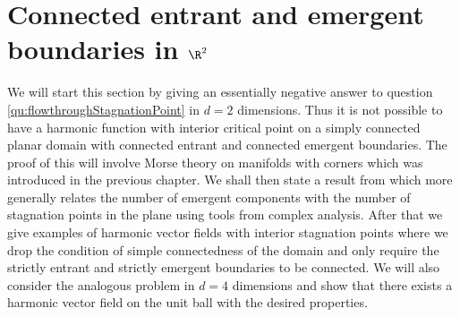 
\chapter{Connected entrant and emergent boundaries in $\R^2$}

We will start this section by giving an essentially negative answer to question \ref{qu:flowthroughStagnationPoint}
in $d=2$ dimensions. Thus it is not possible to have a harmonic function with interior critical point on a simply connected
planar domain with connected entrant and connected emergent boundaries. The proof of this will involve Morse theory on manifolds with corners which was
introduced in the previous chapter.
We shall then state a result from \cite{Alessandrini1992} which more generally relates the number of emergent components with the number
of stagnation points in the plane using tools from complex analysis. 
After that we give examples of harmonic vector fields with interior stagnation points where we drop the condition of simple connectedness of the domain and only require the strictly entrant and strictly emergent boundaries to be connected.
We will also consider the analogous problem in $d=4$ dimensions and show that there exists a harmonic vector field on the unit ball with the
desired properties.

